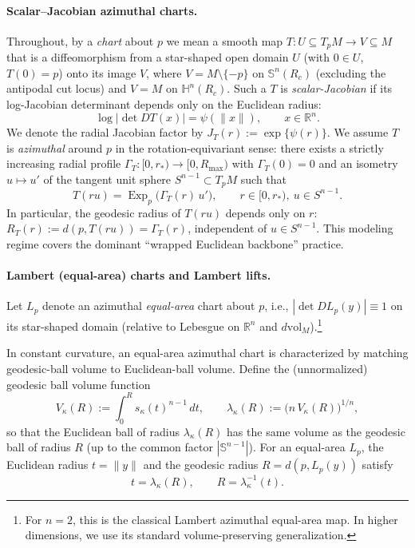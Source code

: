 \documentclass{article}
\theoremstyle{definition}
\theoremstyle{remark}
\newcommand{\RR}{\mathbb{R}}
\newcommand{\SSS}{\mathbb{S}}
\newcommand{\Exp}{\operatorname{Exp}}
\begin{document}
\paragraph{Scalar–Jacobian azimuthal charts.}
Throughout, by a \emph{chart} about $p$ we mean a smooth map
$T:U\subseteq T_pM\to V\subseteq M$ that is a diffeomorphism from a
star-shaped open domain $U$ (with $0\in U$, $T(0)=p$) onto its image $V$,
where $V=M\setminus\{-p\}$ on $\mathbb S^n(R_c)$ (excluding the antipodal
cut locus) and $V=M$ on $\mathbb H^n(R_c)$. Such a $T$ is \emph{scalar-Jacobian}
if its log-Jacobian determinant depends only on the Euclidean radius:
\begin{equation}
\log \bigl|\det DT(x)\bigr| = \psi(\|x\|), \qquad x \in \RR^n .
\label{eq:scalar-jacobian}
\end{equation}
We denote the radial Jacobian factor by $J_T(r):=\exp\{\psi(r)\}$. We assume $T$ is \emph{azimuthal} around $p$ in the rotation-equivariant
sense: there exists a strictly increasing radial profile
$\Gamma_T:[0,r_*)\to[0,R_{\max})$ with $\Gamma_T(0)=0$ and an isometry
$u\mapsto u'$ of the tangent unit sphere $S^{n-1}\subset T_pM$ such that
\begin{equation}\label{eq:azimuthal}
T(ru)=\Exp_p\!\bigl(\Gamma_T(r)\,u'\bigr),
\qquad r\in[0,r_*),\ u\in S^{n-1}.
\end{equation}
In particular, the geodesic radius of $T(ru)$ depends only on $r$:
$R_T(r):=d(p,T(ru))=\Gamma_T(r)$, independent of $u\in S^{n-1}$.
This modeling regime covers the dominant ``wrapped Euclidean backbone'' practice.

\paragraph{Lambert (equal-area) charts and Lambert lifts.}
Let $L_p$ denote an azimuthal \emph{equal-area} chart about $p$, i.e.,
$|\det DL_p(y)|\equiv 1$ on its star-shaped domain (relative to Lebesgue on $\RR^n$ and
$d\mathrm{vol}_M$).\footnote{For $n=2$, this is the classical Lambert azimuthal equal-area map.
In higher dimensions, we use its standard volume-preserving generalization.}

In constant curvature, an equal-area azimuthal chart is characterized by matching geodesic-ball
volume to Euclidean-ball volume. Define the (unnormalized) geodesic ball volume function
\[
V_\kappa(R) := \int_0^R s_\kappa(t)^{n-1}\,dt,
\qquad
\lambda_\kappa(R) := \bigl(n\,V_\kappa(R)\bigr)^{1/n},
\]
so that the Euclidean ball of radius $\lambda_\kappa(R)$ has the same volume as the geodesic ball
of radius $R$ (up to the common factor $|\SSS^{n-1}|$). For an equal-area $L_p$, the Euclidean
radius $t=\|y\|$ and the geodesic radius $R=d(p,L_p(y))$ satisfy
\begin{equation}
t = \lambda_\kappa(R),\qquad R = \lambda_\kappa^{-1}(t).
\label{eq:lambert_radius_map}
\end{equation}
\end{document}
